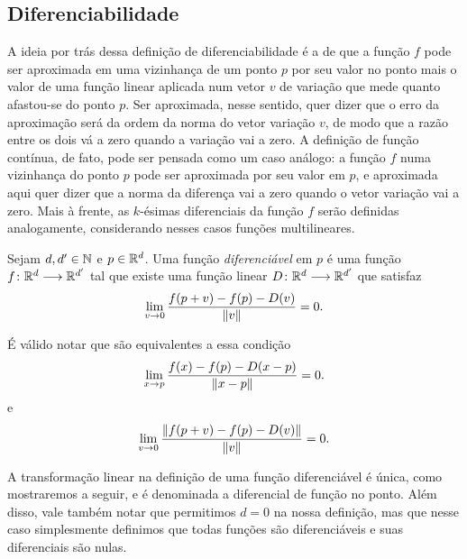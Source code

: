 \subsection{Diferenciabilidade}

A ideia por trás dessa definição de diferenciabilidade é a de que a função $f$ pode ser aproximada em uma vizinhança de um ponto $p$ por seu valor no ponto mais o valor de uma função linear aplicada num vetor $v$ de variação que mede quanto afastou-se do ponto $p$. Ser aproximada, nesse sentido, quer dizer que o erro da aproximação será da ordem da norma do vetor variação $v$, de modo que a razão entre os dois vá a zero quando a variação vai a zero. A definição de função contínua, de fato, pode ser pensada como um caso análogo: a função $f$ numa vizinhança do ponto $p$ pode ser aproximada por seu valor em $p$, e aproximada aqui quer dizer que a norma da diferença vai a zero quando o vetor variação vai a zero. Mais à frente, as $k$-ésimas diferenciais da função $f$ serão definidas analogamente, considerando nesses casos funções multilineares.

\begin{definition}
Sejam $d,d' \in \mathbb{N}$ e $p \in \mathbb{R}^d$. Uma função \emph{diferenciável} em $p$ é uma função ${f}\colon {\mathbb{R}^d} \longrightarrow {\mathbb{R}^{d'}}$ tal que existe uma função linear ${D}\colon {\mathbb{R}^d} \longrightarrow {\mathbb{R}^{d'}}$ que satisfaz
	\begin{equation*}
	\lim_{v \rightarrow 0} \frac{f(p+v)-f(p)-D(v)}{\left\Vert{v}\right\Vert} = 0.
	\end{equation*}
\end{definition}

É válido notar que são equivalentes a essa condição
	\begin{equation*}
	\lim_{x \rightarrow p} \frac{f(x)-f(p)-D(x-p)}{\left\Vert{x-p}\right\Vert} = 0.
	\end{equation*}
e
	\begin{equation*}
	\lim_{v \rightarrow 0} \frac{\left\Vert{f(p+v)-f(p)-D(v)}\right\Vert}{\left\Vert{v}\right\Vert} = 0.
	\end{equation*}

A transformação linear na definição de uma função diferenciável é única, como mostraremos a seguir, e é denominada a diferencial de função no ponto. Além disso, vale também notar que permitimos $d=0$ na nossa definição, mas que nesse caso simplesmente definimos que todas funções são diferenciáveis e suas diferenciais são nulas.

